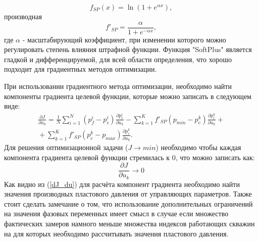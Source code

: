 \documentclass[14pt]{article}
\begin{document}
\begin{equation} \label{SP}
f_{SP}(x) = \ln\left(1+e^{\alpha x}\right),
\end{equation}
производная 
\begin{equation} \label{dSP}
f'_{SP} = \frac{\alpha}{1+e^{-\alpha x}},
\end{equation}
где $ \alpha $ - масштабирующий коэффициент, при изменении которого можно регулировать степень влияния штрафной функции. Функция "SoftPlus" является гладкой и дифференцируемой, для всей области определения, что хорошо подходит для градиентных методов оптимизации. 

При использовании градиентного метода оптимизации, необходимо найти компоненты градиента целевой функции, которые можно записать в следующем виде:
\begin{multline}\label{dJ_du}
	\frac{\partial J}{\partial u_k} = \frac{1}{N}\sum_{i=1}^N \left(p_f^i-p_c^i\right)\frac{\partial p_c^i}{\partial u_k} - \sum_{k=1}^K{f'_{SP}(p_{min} - p^k_c)\frac{\partial p_c^k}{\partial u_k}} + {} \\ {}
	 + \sum_{k=1}^K{f'_{SP}(p^k_c-p_{max})\frac{\partial p_c^k}{\partial u_k}}.
\end{multline}
Для решения оптимизационной задачи ($ J \rightarrow min $) необходимо чтобы каждая компонента градиента целевой функции стремилась к 0, что можно записать как:
\begin{equation} \label{dJ_du0}
\frac{\partial J}{\partial u_k} \rightarrow 0
\end{equation}
Как видно из (\ref{dJ_du}) для расчёта компонент градиента необходимо найти значения производных пластового давления от управляющих параметров. Также стоит сделать замечание о том, что использование дополнительных ограничений на значения фазовых переменных имеет смысл в случае если множество фактических замеров намного меньше множества индексов работающих скважин на для которых необходимо рассчитывать значения пластового давления. 
\end{document}
